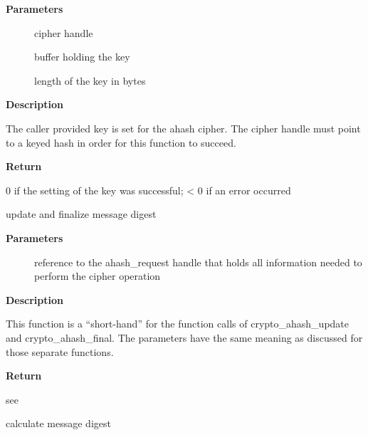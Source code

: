 \documentclass[a4paper,8pt,english]{sphinxmanual}
\begin{document}
\textbf{Parameters}
\begin{description}
\item[{}] \leavevmode
cipher handle

\item[{}] \leavevmode
buffer holding the key

\item[{}] \leavevmode
length of the key in bytes

\end{description}

\textbf{Description}

The caller provided key is set for the ahash cipher. The cipher
handle must point to a keyed hash in order for this function to succeed.

\textbf{Return}

0 if the setting of the key was successful; \textless{} 0 if an error occurred

\begin{fulllineitems}
\label{crypto/api-digest:c.crypto_ahash_finup}
update and finalize message digest

\end{fulllineitems}


\textbf{Parameters}
\begin{description}
\item[{}] \leavevmode
reference to the ahash\_request handle that holds all information
needed to perform the cipher operation

\end{description}

\textbf{Description}

This function is a ``short-hand'' for the function calls of
crypto\_ahash\_update and crypto\_ahash\_final. The parameters have the same
meaning as discussed for those separate functions.

\textbf{Return}

see {\hyperref[crypto/api\string-digest:c.crypto_ahash_final]{\emph{}}}

\begin{fulllineitems}
\label{crypto/api-digest:c.crypto_ahash_final}
calculate message digest

\end{fulllineitems}
\end{document}
